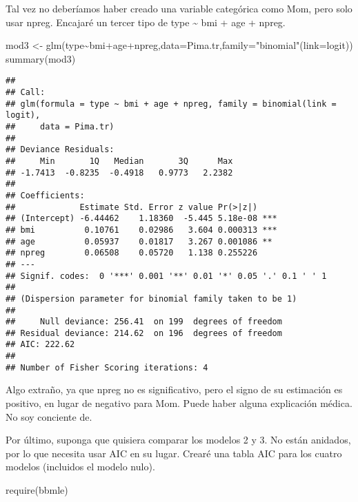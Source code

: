 \documentclass[
]{book}
\newenvironment{Shaded}{\begin{snugshade}}{\end{snugshade}}
\newcommand{\AttributeTok}[1]{\textcolor[rgb]{0.77,0.63,0.00}{#1}}
\newcommand{\FunctionTok}[1]{\textcolor[rgb]{0.00,0.00,0.00}{#1}}
\newcommand{\NormalTok}[1]{#1}
\newcommand{\OtherTok}[1]{\textcolor[rgb]{0.56,0.35,0.01}{#1}}
\newcommand{\SpecialCharTok}[1]{\textcolor[rgb]{0.00,0.00,0.00}{#1}}
\newcommand{\StringTok}[1]{\textcolor[rgb]{0.31,0.60,0.02}{#1}}
\begin{document}
Tal vez no deberíamos haber creado una variable categórica como Mom, pero solo usar
npreg. Encajaré un tercer tipo de type \textasciitilde{} bmi + age + npreg.

\begin{Shaded}
\begin{Highlighting}[]
\NormalTok{mod3 }\OtherTok{\textless{}{-}} \FunctionTok{glm}\NormalTok{(type}\SpecialCharTok{\textasciitilde{}}\NormalTok{bmi}\SpecialCharTok{+}\NormalTok{age}\SpecialCharTok{+}\NormalTok{npreg,}\AttributeTok{data=}\NormalTok{Pima.tr,}\AttributeTok{family=}\StringTok{"binomial"}\NormalTok{(}\AttributeTok{link=}\NormalTok{logit))}
\FunctionTok{summary}\NormalTok{(mod3)}
\end{Highlighting}
\end{Shaded}

\begin{verbatim}
## 
## Call:
## glm(formula = type ~ bmi + age + npreg, family = binomial(link = logit), 
##     data = Pima.tr)
## 
## Deviance Residuals: 
##     Min       1Q   Median       3Q      Max  
## -1.7413  -0.8235  -0.4918   0.9773   2.2382  
## 
## Coefficients:
##             Estimate Std. Error z value Pr(>|z|)    
## (Intercept) -6.44462    1.18360  -5.445 5.18e-08 ***
## bmi          0.10761    0.02986   3.604 0.000313 ***
## age          0.05937    0.01817   3.267 0.001086 ** 
## npreg        0.06508    0.05720   1.138 0.255226    
## ---
## Signif. codes:  0 '***' 0.001 '**' 0.01 '*' 0.05 '.' 0.1 ' ' 1
## 
## (Dispersion parameter for binomial family taken to be 1)
## 
##     Null deviance: 256.41  on 199  degrees of freedom
## Residual deviance: 214.62  on 196  degrees of freedom
## AIC: 222.62
## 
## Number of Fisher Scoring iterations: 4
\end{verbatim}

Algo extraño, ya que npreg no es significativo, pero el signo de su estimación es positivo,
en lugar de negativo para Mom. Puede haber alguna explicación médica. No soy
conciente de.

Por último, suponga que quisiera comparar los modelos 2 y 3. No están anidados, por lo que
necesita usar AIC en su lugar. Crearé una tabla AIC para los cuatro modelos (incluidos el modelo nulo).

\begin{Shaded}
\begin{Highlighting}[]
\FunctionTok{require}\NormalTok{(bbmle)}
\end{Highlighting}
\end{Shaded}
\end{document}
